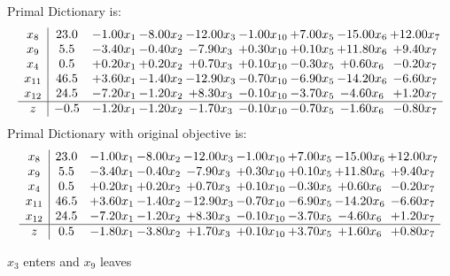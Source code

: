 \documentclass[8pt]{article}
\begin{document}
Primal Dictionary is:
\[\begin{array}{c| c c@{\hskip 2pt} c@{\hskip 2pt} c@{\hskip 2pt} c@{\hskip 2pt} c@{\hskip 2pt} c@{\hskip 2pt} c@{\hskip 2pt} }
 x_{8}   &  23.0 & -1.00 x_{1} & -8.00 x_{2} & -12.00 x_{3} & -1.00 x_{10} & +  7.00 x_{5} & -15.00 x_{6} & + 12.00 x_{7}\\
 x_{9}   &  5.5 & -3.40 x_{1} & -0.40 x_{2} & -7.90 x_{3} & +  0.30 x_{10} & +  0.10 x_{5} & + 11.80 x_{6} & +  9.40 x_{7}\\
 x_{4}   &  0.5 & +  0.20 x_{1} & +  0.20 x_{2} & +  0.70 x_{3} & +  0.10 x_{10} & -0.30 x_{5} & +  0.60 x_{6} & -0.20 x_{7}\\
 x_{11}   &  46.5 & +  3.60 x_{1} & -1.40 x_{2} & -12.90 x_{3} & -0.70 x_{10} & -6.90 x_{5} & -14.20 x_{6} & -6.60 x_{7}\\
 x_{12}   &  24.5 & -7.20 x_{1} & -1.20 x_{2} & +  8.30 x_{3} & -0.10 x_{10} & -3.70 x_{5} & -4.60 x_{6} & +  1.20 x_{7}\\
\hline
z    &  -0.5 & -1.20 x_{1} & -1.20 x_{2} & -1.70 x_{3} & -0.10 x_{10} & -0.70 x_{5} & -1.60 x_{6} & -0.80 x_{7}\\
\end{array}\]
Primal Dictionary with original objective is:
\[\begin{array}{c| c c@{\hskip 2pt} c@{\hskip 2pt} c@{\hskip 2pt} c@{\hskip 2pt} c@{\hskip 2pt} c@{\hskip 2pt} c@{\hskip 2pt} }
 x_{8}   &  23.0 & -1.00 x_{1} & -8.00 x_{2} & -12.00 x_{3} & -1.00 x_{10} & +  7.00 x_{5} & -15.00 x_{6} & + 12.00 x_{7}\\
 x_{9}   &  5.5 & -3.40 x_{1} & -0.40 x_{2} & -7.90 x_{3} & +  0.30 x_{10} & +  0.10 x_{5} & + 11.80 x_{6} & +  9.40 x_{7}\\
 x_{4}   &  0.5 & +  0.20 x_{1} & +  0.20 x_{2} & +  0.70 x_{3} & +  0.10 x_{10} & -0.30 x_{5} & +  0.60 x_{6} & -0.20 x_{7}\\
 x_{11}   &  46.5 & +  3.60 x_{1} & -1.40 x_{2} & -12.90 x_{3} & -0.70 x_{10} & -6.90 x_{5} & -14.20 x_{6} & -6.60 x_{7}\\
 x_{12}   &  24.5 & -7.20 x_{1} & -1.20 x_{2} & +  8.30 x_{3} & -0.10 x_{10} & -3.70 x_{5} & -4.60 x_{6} & +  1.20 x_{7}\\
\hline
z    &  0.5 & -1.80 x_{1} & -3.80 x_{2} & +  1.70 x_{3} & +  0.10 x_{10} & +  3.70 x_{5} & +  1.60 x_{6} & +  0.80 x_{7}\\
\end{array}\]


 $ x_{3} $ enters and $ x_{9} $ leaves 
\end{document}
